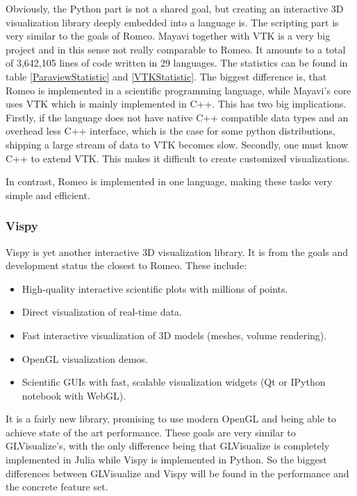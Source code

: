 Obviously, the Python part is not a shared goal, but creating an interactive 3D visualization library deeply embedded into a language is. The scripting part is very similar to the goals of Romeo.
Mayavi together with VTK is a very big project and in this sense not really comparable to Romeo.
It amounts to a total of 3,642,105 lines of code written in 29 languages. The statistics can be found in table \cref{ParaviewStatistic} and \cref{VTKStatistic}.
The biggest difference is, that Romeo is implemented in a scientific programming language, while Mayavi's core uses VTK which is mainly implemented in C++.
This has two big implications.
Firstly, if the language does not have native C++ compatible data types and an overhead less C++ interface, which is the case for some python distributions, shipping a large stream of data to VTK becomes slow.
Secondly, one must know C++ to extend VTK. This makes it difficult to create customized visualizations.

In contrast, Romeo is implemented in one language, making these tasks very simple and efficient.


\subsubsection{Vispy}

Vispy is yet another interactive 3D visualization library. It is from the goals and development status the closest to Romeo.
These include\cite{VispyGoals}:

\begin{itemize}
	\item High-quality interactive scientific plots with millions of points.
	\item Direct visualization of real-time data.
	\item Fast interactive visualization of 3D models (meshes, volume rendering).
	\item OpenGL visualization demos.
	\item Scientific GUIs with fast, scalable visualization widgets (Qt or IPython notebook with \ac{WebGL}).
\end{itemize}

It is a fairly new library, promising to use modern OpenGL and being able to achieve state of the art performance.
These goals are very similar to GLVisualize's, with the only difference being that GLVisualize is completely implemented in Julia while Vispy is implemented in Python.
So the biggest differences between GLVisualize and Vispy will be found in the performance and the concrete feature set.
